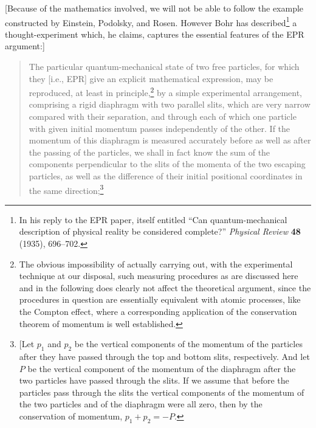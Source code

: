 [Because of the mathematics involved, we will not be able to follow the
example constructed by Einstein, Podolsky, and Rosen. However Bohr has
described\footnote{In his reply to the EPR paper, itself entitled ``Can quantum-mechanical 
description of physical reality be considered complete?'' \emph{Physical Review} 
\textbf{48} (1935), 696--702.} a thought-experiment which, he claims,
captures the essential features of the EPR argument:]
\begin{quote}
The particular quantum-mechanical state of two free particles, for which
they {[}i.e., EPR{]} give an explicit mathematical expression, may be
reproduced, at least in principle,\footnote{The obvious impossibility of
  actually carrying out, with the experimental technique at our
  disposal, such measuring procedures as are discussed here and in the
  following does clearly not affect the theoretical argument, since the
  procedures in question are essentially equivalent with atomic
  processes, like the Compton effect, where a corresponding application
  of the conservation theorem of momentum is well established.} by a
simple experimental arrangement, comprising a rigid diaphragm with two
parallel slits, which are very narrow compared with their separation,
and through each of which one particle with given initial momentum
passes independently of the other. If the momentum of this diaphragm is
measured accurately before as well as after the passing of the
particles, we shall in fact know the sum of the components perpendicular
to the slits of the momenta of the two escaping particles, as well as
the difference of their initial positional coordinates in the same
direction;\footnote{{[}Let $p_1$ and $p_2$ be the vertical
  components of the momentum of the particles after they have passed
  through the top and bottom slits, respectively. And let $P$ be
  the vertical component of the momentum of the diaphragm after the two
  particles have passed through the slits. If we assume that before the
  particles pass through the slits the vertical components of the
  momentum of the two particles and of the diaphragm were all zero, then
  by the conservation of momentum, $p_1 + p_2 = -P$.
  
}
\end{quote}
